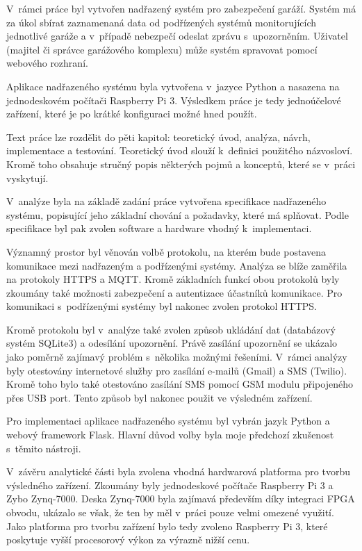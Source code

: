 
V~rámci práce byl vytvořen nadřazený systém pro zabezpečení garáží. Systém má za úkol sbírat zaznamenaná data od podřízených systémů monitorujících jednotlivé garáže a v~případě nebezpečí odeslat zprávu s~upozorněním. Uživatel (majitel či správce garážového komplexu) může systém spravovat pomocí webového rozhraní.

Aplikace nadřazeného systému byla vytvořena v~jazyce Python a nasazena na jednodeskovém počítači Raspberry Pi 3. Výsledkem práce je tedy jednoúčelové zařízení, které je po krátké konfiguraci možné hned použít.

Text práce lze rozdělit do pěti kapitol: teoretický úvod, analýza, návrh, implementace a testování. Teoretický úvod slouží k~definici použitého názvosloví. Kromě toho obsahuje stručný popis některých pojmů a konceptů, které se v~práci vyskytují.

V~analýze byla na základě zadání práce vytvořena specifikace nadřazeného systému, popisující jeho základní chování a požadavky, které má splňovat. Podle specifikace byl pak zvolen software a hardware vhodný k~implementaci.

Významný prostor byl věnován volbě protokolu, na kterém bude postavena komunikace mezi nadřazeným a podřízenými systémy. Analýza se blíže zaměřila na protokoly HTTPS a MQTT. Kromě základních funkcí obou protokolů byly zkoumány také možnosti zabezpečení a autentizace účastníků komunikace. Pro komunikaci s~podřízenými systémy byl nakonec zvolen protokol HTTPS.

Kromě protokolu byl v~analýze také zvolen způsob ukládání dat (databázový systém SQLite3) a odesílání upozornění. Právě zasílání upozornění se ukázalo jako poměrně zajímavý problém s~několika možnými řešeními. V~rámci analýzy byly otestovány internetové služby pro zasílání e-mailů (Gmail) a SMS (Twilio). Kromě toho bylo také otestováno zasílání SMS pomocí GSM modulu připojeného přes USB port. Tento způsob byl nakonec použit ve výsledném zařízení.

Pro implementaci aplikace nadřazeného systému byl vybrán jazyk Python a webový framework Flask. Hlavní důvod volby byla moje předchozí zkušenost s~těmito nástroji.

V~závěru analytické části byla zvolena vhodná hardwarová platforma pro tvorbu výsledného zařízení. Zkoumány byly jednodeskové počítače Raspberry Pi 3 a Zybo Zynq-7000. Deska Zynq-7000 byla zajímavá především díky integraci FPGA obvodu, ukázalo se však, že ten by měl v~práci pouze velmi omezené využití. Jako platforma pro tvorbu zařízení bylo tedy zvoleno Raspberry Pi 3, které poskytuje vyšší procesorový výkon za výrazně nižší cenu.

